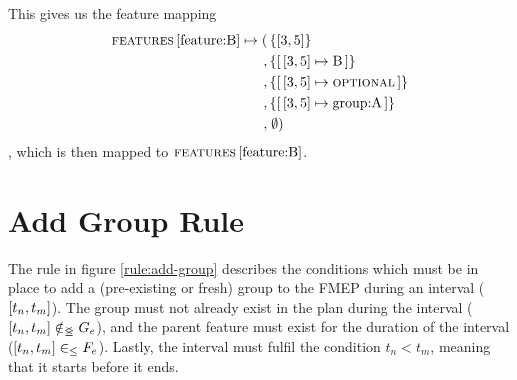  This gives us the feature mapping
\begin{align*}
  \lookup{\features{}}{\text{feature:B}} \mapsto ( & \set{\interval{3}{5}} \\
  , & \set{\intervalmapping{3}{5}{\text{B}}}\\
  , & \set{\intervalmapping{3}{5}{\optional{}}}\\
  , & \set{\intervalmapping{3}{5}{\text{group:A}}}\\
  , & \; \emptyset)
\end{align*}
, which is then mapped to $\textsc{features}{} \left[ \text{feature:B} \right]$.





\section{Add Group Rule}
\label{sec:add-group-rule}
The rule in figure \ref{rule:add-group} describes the conditions which must be in place to add a (pre-existing or fresh) group to the FMEP during an interval ($\interval{t_n}{t_m}$). The group must not already exist in the plan during the interval ($\interval{t_n}{t_m} \notinnr G_e$), and the parent feature must exist for the duration of the interval ($\interval{t_n}{t_m} \inn F_e$). Lastly, the interval must fulfil the condition $t_n < t_m$, meaning that it starts before it ends. 

